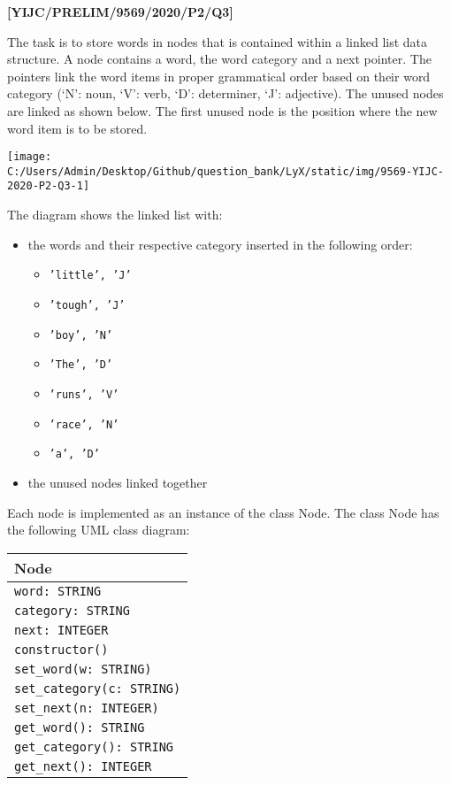 \item \textbf{{[}YIJC/PRELIM/9569/2020/P2/Q3{]} }

The task is to store words in nodes that is contained within a linked
list data structure. A node contains a word, the word category and
a next pointer. The pointers link the word items in proper grammatical
order based on their word category (\textquoteleft N\textquoteright :
noun, \textquoteleft V\textquoteright : verb, \textquoteleft D\textquoteright :
determiner, \textquoteleft J\textquoteright : adjective). The unused
nodes are linked as shown below. The first unused node is the position
where the new word item is to be stored.
\begin{center}
\texttt{[image: C:/Users/Admin/Desktop/Github/question\_bank/LyX/static/img/9569-YIJC-2020-P2-Q3-1]}
\par\end{center}

The diagram shows the linked list with:
\begin{itemize}
\item the words and their respective category inserted in the following
order: 
\begin{itemize}
\item \texttt{'little', 'J' }
\item \texttt{'tough', 'J' }
\item \texttt{'boy', 'N' }
\item \texttt{'The', 'D' }
\item \texttt{'runs', 'V' }
\item \texttt{'race', 'N' }
\item \texttt{'a', 'D'}
\end{itemize}
\item the unused nodes linked together
\end{itemize}
Each node is implemented as an instance of the class Node. The class
Node has the following UML class diagram:
\begin{center}
\begin{tabular}{|l|}
\hline 
\hspace{0.25\columnwidth}Node\tabularnewline
\hline 
\texttt{word: STRING}\tabularnewline
\texttt{category: STRING}\tabularnewline
\texttt{next: INTEGER}\tabularnewline
\hline 
\texttt{constructor()}\tabularnewline
\texttt{set\_word(w: STRING)}\tabularnewline
\texttt{set\_category(c: STRING)}\tabularnewline
\texttt{set\_next(n: INTEGER)}\tabularnewline
\texttt{get\_word(): STRING}\tabularnewline
\texttt{get\_category(): STRING}\tabularnewline
\texttt{get\_next(): INTEGER}\tabularnewline
\hline 
\end{tabular}
\par\end{center}

